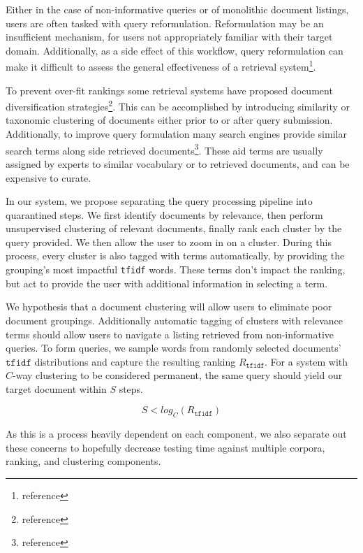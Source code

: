 \documentclass[11pt]{article}
\def\tfidf{\texttt{tfidf}\xspace}
\begin{document}
Either in the case of non-informative queries or of monolithic document listings, users
are often tasked with query reformulation. Reformulation may be an insufficient mechanism,
for users not appropriately familiar with their target domain. Additionally, as
a side effect of this workflow, query reformulation can make it difficult to assess
the general effectiveness of a retrieval system\footnote{reference}.

To prevent over-fit rankings some retrieval systems have proposed document diversification
strategies\footnote{reference}. This can be accomplished by introducing similarity or
taxonomic clustering of documents either prior to or after query submission. Additionally,
to improve query formulation many search engines provide similar search terms along side
retrieved documents\footnote{reference}. These aid terms are usually assigned by experts
to similar vocabulary or to retrieved documents, and can be expensive to curate.

In our system, we propose separating the query processing pipeline into quarantined
steps. We first identify documents by relevance, then perform unsupervised clustering
of relevant documents, finally rank each cluster by the query provided. We then allow
the user to zoom in on a cluster. During this process, every cluster is also tagged with
terms automatically, by providing the grouping's most impactful \tfidf words. These terms
don't impact the ranking, but act to provide the user with additional information in
selecting a term.

We hypothesis that a document clustering will allow users to eliminate poor document
groupings. Additionally automatic tagging of clusters with relevance terms should allow
users to navigate a listing retrieved from non-informative queries. To form queries, we
sample words from randomly selected documents' $\tfidf$ distributions and capture the
resulting ranking $R_\tfidf$. For a system with $C$-way clustering to be considered
permanent, the same query should yield our target document within $S$ steps.

\[S < log_C (R_\tfidf)\]

As this is a process heavily dependent on each component, we also separate out these
concerns to hopefully decrease testing time against multiple corpora, ranking, and
clustering components.

\end{document}
